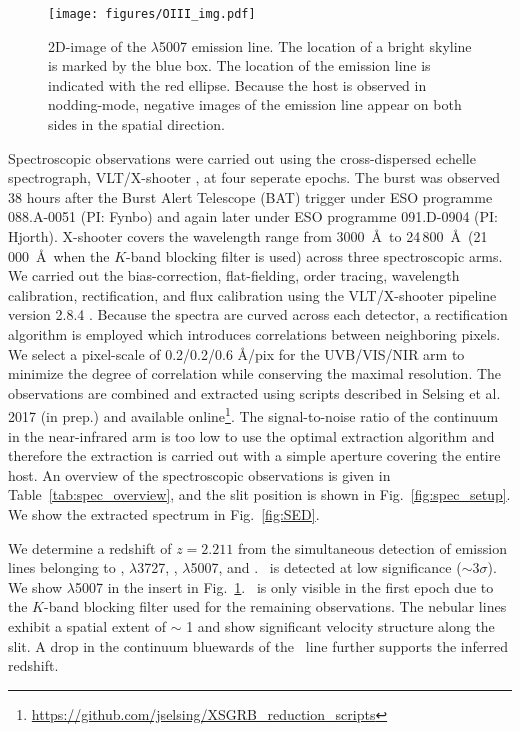 \documentclass{aa}    %
\begin{document}
\begin{figure}
	\centering
	\texttt{[image: figures/OIII\_img.pdf]}
	\caption{2D-image of the \oiii$\lambda$5007 emission line. The location of a bright skyline is marked by the blue box. The location of the emission line is indicated with the red ellipse. Because the host is observed in nodding-mode, negative images of the emission line appear on both sides in the spatial direction.}
	\label{fig:line}
\end{figure}

Spectroscopic observations were carried out using the cross-dispersed echelle
spectrograph, VLT/X-shooter \citep{Vernet2011}, at four seperate epochs. The
burst was observed 38 hours after the Burst Alert Telescope (BAT) trigger under
ESO programme 088.A-0051 (PI: Fynbo) and again later under ESO programme
091.D-0904 (PI: Hjorth). X-shooter covers the wavelength range from 3000~\AA~to
24\,800~\AA~(21\,000~\AA~when the $K$-band blocking filter is used) across three
spectroscopic arms. We carried out the bias-correction, flat-fielding, order
tracing, wavelength calibration, rectification, and flux calibration using the
VLT/X-shooter pipeline version 2.8.4 \citep{Modigliani2010}.
Because the spectra are curved across each detector, a rectification algorithm
is employed which introduces correlations between neighboring pixels. We select
a pixel-scale of 0.2/0.2/0.6 \AA/pix for the UVB/VIS/NIR arm to minimize the
degree of correlation while conserving the maximal resolution.
The observations are combined and extracted using scripts described in Selsing
et al. 2017 (in prep.) and available
online\footnote{\url{https://github.com/jselsing/XSGRB_reduction_scripts}}. 
The signal-to-noise ratio of the continuum in the near-infrared arm is too low
to use the optimal extraction algorithm \citep{Horne1986} and therefore the
extraction is carried out with a simple aperture covering the entire host.
An overview of the spectroscopic observations is given in
Table~\ref{tab:spec_overview}, and the slit position is shown in
Fig.~\ref{fig:spec_setup}. We show the extracted spectrum in Fig.~\ref{fig:SED}.



We determine a redshift of $z = 2.211$ from the simultaneous detection of
emission lines belonging to \lya, \oii$\lambda$3727, \hb, \oiii$\lambda$5007,
and \ha. \hb~is detected at low significance ($\sim 3 \sigma$). We show
\oiii$\lambda$5007 in the insert in Fig.~\ref{fig:line}.  \ha~is only visible in
the first epoch due to the $K$-band blocking filter used for the remaining
observations. The nebular lines exhibit a spatial extent of $\sim$ 1 and
show significant velocity structure along the slit. A drop in the continuum
bluewards of the \lya~line further supports the inferred redshift.
\end{document}
